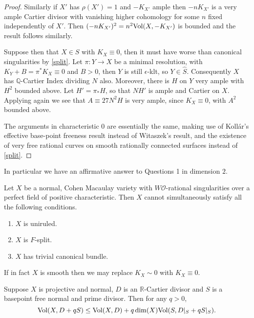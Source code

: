 \begin{proof}
		Similarly if $X'$ has $\rho(X')=1$ and $-K_{X'}$ ample then $-nK_{X'}$ is a very ample Cartier divisor with vanishing higher cohomology for some $n$ fixed independently of $X'$. Then $(-nK_{X'})^{2}=n^{2}\text{Vol}(X,-K_{X'})$ is bounded and the result follows similarly.
		
		Suppose then that $X \in S$ with $K_{X} \equiv 0$, then it must have worse than canonical singularities by \autoref{split}. Let $\pi\colon Y \to X$ be a minimal resolution, with $K_{Y}+B=\pi^{*}K_{X} \equiv 0$ and $B >0$, then $Y$ is still $\epsilon$-klt, so $Y \in \hat{S}$. Consequently $X$ has $\mathbb{Q}$-Cartier Index dividing $N$ also. Moreover, there is $H$ on $Y$ very ample with $H^{2}$ bounded above. Let $H'=\pi_{*}H$, so that $NH'$ is ample and Cartier on $X$. Applying \cite[Theorem 4.1]{witaszek2015effective} again we see that $A\equiv 27N^{2}H$ is very ample, since $K_{X}\equiv 0$, with $A^{2}$ bounded above.
		
		The arguments in characteristic $0$ are essentially the same, making use of Koll{\'a}r's effective base-point freeness result \cite[Theorem 1.1, Lemma 1.2]{kollar1993effective} instead of Witaszek's result, and the existence of very free rational curves on smooth rationally connected surfaces instead of \autoref{split}.
	\end{proof}

\begin{remark}
	In particular we have an affirmative answer to Questions 1 in dimension $2$.
\end{remark}

\begin{theorem}\cite[Theorem 1.2]{patakfalvi2019ordinary}\label{split}
	Let $X$ be a normal, Cohen Macaulay variety with $W\mathcal{O}$-rational singularities over a perfect field of positive characteristic. Then $X$ cannot simultaneously satisfy all the following conditions.
	\begin{enumerate}
		\item $X$ is uniruled.
		\item $X$ is $F$-split.
		\item $X$ has trivial canonical bundle.
	\end{enumerate}
	If in fact $X$ is smooth then we may replace $K_{X}\sim 0$ with $K_{X} \equiv 0$.
\end{theorem}

\begin{lemma}\label{vol}\cite[Lemma 2.5]{jiang2018birational}
	Suppose $X$ is projective and normal, $D$ is an $\mathbb{R}$-Cartier divisor and $S$ is a basepoint free normal and prime divisor. Then for any $q >0$,
	\[\text{Vol}(X,D+qS) \leq \text{Vol}(X,D) + q\dim(X)\text{Vol}(S,D|_{S}+qS|_{S}).\]
\end{lemma}	

